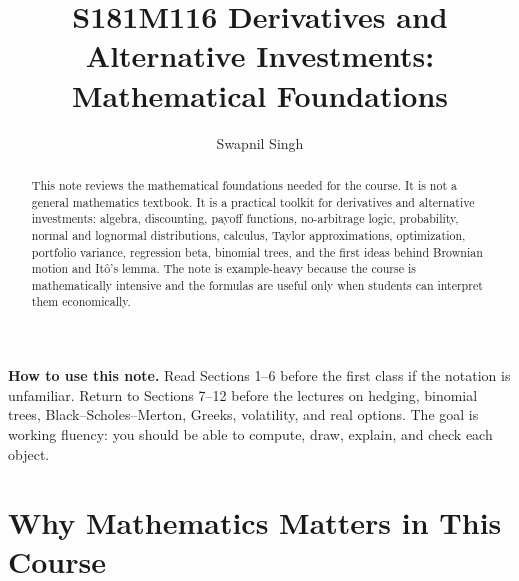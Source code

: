 

\title{S181M116 Derivatives and Alternative Investments: Mathematical Foundations}
\author{Swapnil Singh}
\date{}


\setlength{\headheight}{26pt}

\newcommand{\R}{\mathbb{R}}
\newcommand{\Prob}{\mathbb{P}}
\newcommand{\Var}{\operatorname{Var}}
\newcommand{\Cov}{\operatorname{Cov}}
\newcommand{\Corr}{\operatorname{Corr}}
\newcommand{\NPV}{\mathrm{NPV}}
\newcommand{\PV}{\mathrm{PV}}
\newcommand{\FV}{\mathrm{FV}}
\newcommand{\St}{S_T}
\newcommand{\Szero}{S_0}
\newcommand{\Fzero}{F_0}
\newcommand{\K}{K}
\newcommand{\dd}{\,d}


\maketitle

\begin{abstract}
This note reviews the mathematical foundations needed for the course. It is not
a general mathematics textbook. It is a practical toolkit for derivatives and
alternative investments: algebra, discounting, payoff functions, no-arbitrage
logic, probability, normal and lognormal distributions, calculus, Taylor
approximations, optimization, portfolio variance, regression beta, binomial
trees, and the first ideas behind Brownian motion and It\^o's lemma. The note is
example-heavy because the course is mathematically intensive and the formulas are
useful only when students can interpret them economically.
\end{abstract}

\begin{boxD}
\textbf{How to use this note.} Read Sections 1--6 before the first class if the
notation is unfamiliar. Return to Sections 7--12 before the lectures on hedging,
binomial trees, Black--Scholes--Merton, Greeks, volatility, and real options.
The goal is working fluency: you should be able to compute, draw, explain, and
check each object.
\end{boxD}

\section{Why Mathematics Matters in This Course}

